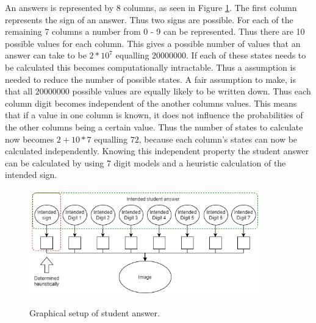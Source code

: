 An answers is represented by 8 columns, as seen in Figure \ref{fig:stdAns}. The first column represents the sign of an answer. Thus two signs are possible. For each of the remaining 7 columns a number from 0 - 9 can be represented. Thus there are 10 possible values for each column. This gives a possible number of values that an answer can take to be $2*10^7$ equalling $20 000 000$. If each of these states needs to be calculated this becomes computationally intractable. Thus a assumption is needed to reduce the number of possible states. A fair assumption to make, is that all $20 000 000$ possible values are equally likely to be written down. Thus each column digit becomes independent of the another columns values. This means that if a value in one column is known, it does not influence the probabilities of the other columns being a certain value. Thus the number of states to calculate now becomes $2+10*7$ equalling $72$, because each column's states can now be calculated independently. Knowing this independent property the student answer can be calculated by using 7 digit models and a heuristic calculation of the intended sign.

\begin{figure}
  \centering
  \includegraphics[width=10cm]{ans}\\
  \caption{Graphical setup of student answer.}
  \label{fig:stdAns}
\end{figure}




